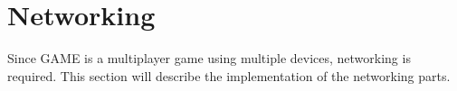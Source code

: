 \section{Networking}
Since GAME is a multiplayer game using multiple devices, networking is required. This section will describe the implementation of the networking parts.



